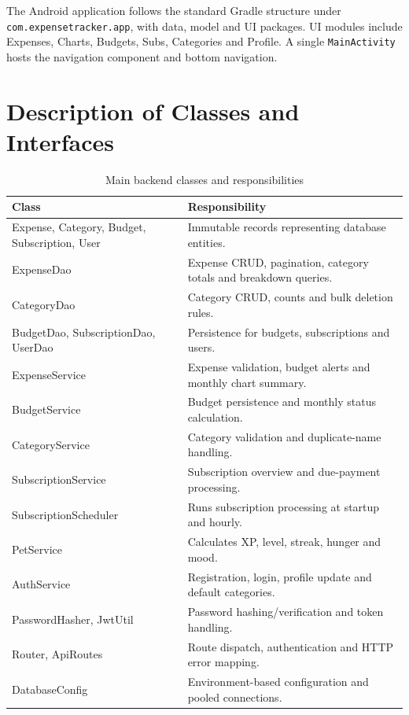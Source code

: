 \documentclass[12pt,a4paper]{report}
\begin{document}
The Android application follows the standard Gradle structure under \texttt{com.expensetracker.app}, with data, model and UI packages. UI modules include Expenses, Charts, Budgets, Subs, Categories and Profile. A single \texttt{MainActivity} hosts the navigation component and bottom navigation.

\section{Description of Classes and Interfaces}
\begin{table}[H]\centering\caption{Main backend classes and responsibilities}\small
\begin{tabularx}{\linewidth}{@{}>{\ttfamily\raggedright\arraybackslash}p{.28\linewidth}X@{}}\toprule Class & Responsibility\\\midrule
Expense, Category, Budget, Subscription, User & Immutable records representing database entities.\\
ExpenseDao & Expense CRUD, pagination, category totals and breakdown queries.\\
CategoryDao & Category CRUD, counts and bulk deletion rules.\\
BudgetDao, SubscriptionDao, UserDao & Persistence for budgets, subscriptions and users.\\
ExpenseService & Expense validation, budget alerts and monthly chart summary.\\
BudgetService & Budget persistence and monthly status calculation.\\
CategoryService & Category validation and duplicate-name handling.\\
SubscriptionService & Subscription overview and due-payment processing.\\
SubscriptionScheduler & Runs subscription processing at startup and hourly.\\
PetService & Calculates XP, level, streak, hunger and mood.\\
AuthService & Registration, login, profile update and default categories.\\
PasswordHasher, JwtUtil & Password hashing/verification and token handling.\\
Router, ApiRoutes & Route dispatch, authentication and HTTP error mapping.\\
DatabaseConfig & Environment-based configuration and pooled connections.\\\bottomrule
\end{tabularx}\end{table}
\end{document}
